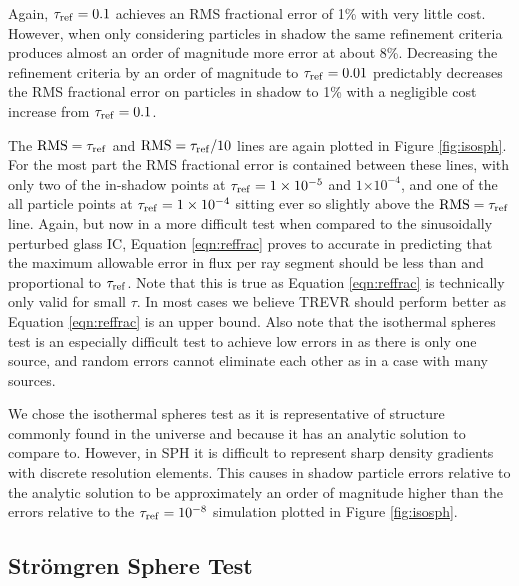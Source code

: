 \documentclass[fleq,usenatbib]{mnras}
\newcommand{\acro}{TREVR}
\providecommand{\e}[1]{\ensuremath{\times10^{#1}}}
\newcommand{\tr}{\tau_{\rm ref}}
\newcommand{\strom}{Str\"omgren}
\begin{document}
Again, $\tr=0.1$ achieves an RMS fractional error of 1\% with very 
little cost. However, when only considering particles in shadow the same 
refinement criteria produces almost an order of magnitude more error at about 
8\%. Decreasing the refinement criteria by an order of magnitude to 
$\tr=0.01$ predictably decreases the RMS fractional error on particles in 
shadow to 1\% with a negligible cost increase from $\tr=0.1$. 

The $\rm{RMS}=\tr$ and $\rm{RMS}=\tr/10$ lines are again plotted in Figure 
\ref{fig:isosph}. For the most part the RMS fractional error is contained 
between these lines, with only two of the in-shadow points at $\tr=1\e{-5}$ 
and $1\e{-4}$,  and one of the all particle points at  $\tr=1\e{-4}$ sitting 
ever so slightly above the $\rm{RMS}=\tr$ line. Again, but now in a more 
difficult test when compared to the sinusoidally perturbed glass IC, Equation 
\ref{eqn:reffrac} proves to accurate in predicting that the maximum allowable 
error in flux per ray segment should be less than and proportional to $\tr$.
Note that this is true as Equation \ref{eqn:reffrac} is technically only valid 
for small $\tau$. In most cases we believe \acro{} should perform better as 
Equation \ref{eqn:reffrac} is an upper bound. Also note that the isothermal 
spheres test is an especially difficult test to achieve low errors in as there 
is only one source, and random errors cannot eliminate each other as in a 
case with many sources.

We chose the isothermal spheres test as it is representative of structure
commonly found in the universe and because it has an analytic solution to 
compare to. However, in SPH it is difficult to represent sharp density 
gradients with discrete resolution elements. This causes in shadow particle 
errors relative to the analytic solution to be approximately an order of 
magnitude higher than the errors relative to the $\tr = 10^{-8}$ simulation
plotted in Figure \ref{fig:isosph}.

\subsection{\strom{} Sphere Test}
\end{document}
